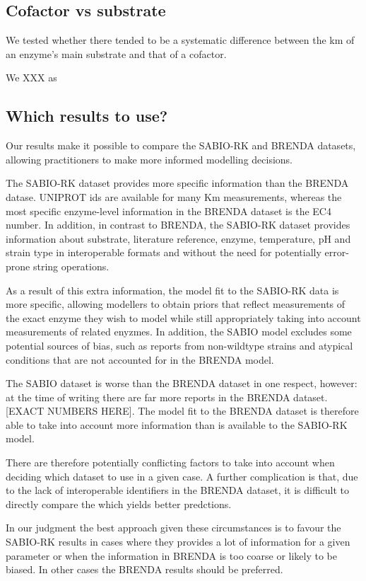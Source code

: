 \documentclass[11pt]{article}
\begin{document}
\subsection{Cofactor vs substrate}
\label{sec:org17699d8}
We tested whether there tended to be a systematic difference between the km of
an enzyme's main substrate and that of a cofactor.

We XXX as 

\subsection{Which results to use?}
\label{sec:org604b259}

Our results make it possible to compare the SABIO-RK and BRENDA datasets,
allowing practitioners to make more informed modelling decisions.

The SABIO-RK dataset provides more specific information than the BRENDA
datase. UNIPROT ids are available for many Km measurements, whereas the most
specific enzyme-level information in the BRENDA dataset is the EC4 number. In
addition, in contrast to BRENDA, the SABIO-RK dataset provides information about
substrate, literature reference, enzyme, temperature, pH and strain type in
interoperable formats and without the need for potentially error-prone string
operations.

As a result of this extra information, the model fit to the SABIO-RK data is
more specific, allowing modellers to obtain priors that reflect measurements of
the exact enzyme they wish to model while still appropriately taking into
account measurements of related enyzmes. In addition, the SABIO model excludes
some potential sources of bias, such as reports from non-wildtype strains and
atypical conditions that are not accounted for in the BRENDA model.

The SABIO dataset is worse than the BRENDA dataset in one respect, however: at
the time of writing there are far more reports in the BRENDA dataset. [EXACT
NUMBERS HERE]. The model fit to the BRENDA dataset is therefore able to take
into account more information than is available to the SABIO-RK model.

There are therefore potentially conflicting factors to take into account when
deciding which dataset to use in a given case. A further complication is that,
due to the lack of interoperable identifiers in the BRENDA dataset, it is
difficult to directly compare the which yields better predctions.

In our judgment the best approach given these circumstances is to favour the
SABIO-RK results in cases where they provides a lot of information for a given
parameter or when the information in BRENDA is too coarse or likely to be
biased. In other cases the BRENDA results should be preferred.
\end{document}
